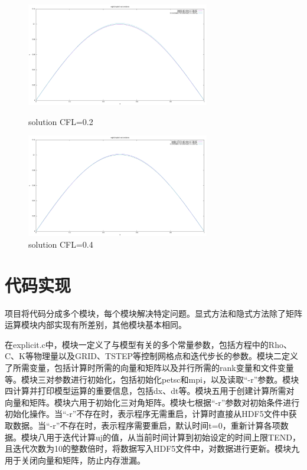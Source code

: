 \documentclass[final]{cvpr}
\begin{document}
\begin{figure}[t]
	\centering
	\begin{minipage}[t]{0.48\textwidth}
		\centering
		\includegraphics[width=8cm]{./figures/solution_CFL0.2.png}
		\caption{solution CFL=0.2}
	\end{minipage}
	\begin{minipage}[t]{0.48\textwidth}
		\centering
		\includegraphics[width=8cm]{./figures/solution_CFL0.4.png}
		\caption{solution CFL=0.4}
	\end{minipage}
\end{figure}
\section{代码实现}
\label{sec:RelatedWorks}
项目将代码分成多个模块，每个模块解决特定问题。显式方法和隐式方法除了矩阵运算模块内部实现有所差别，其他模块基本相同。

在explicit.c中，模块一定义了与模型有关的多个常量参数，包括方程中的Rho、C、K等物理量以及GRID、TSTEP等控制网格点和迭代步长的参数。模块二定义了所需变量，包括计算时所需的向量和矩阵以及并行所需的rank变量和文件变量等。模块三对参数进行初始化，包括初始化petsc和mpi，以及读取“-r”参数。模块四计算并打印模型运算的重要信息，包括dx、dt等。模块五用于创建计算所需对向量和矩阵。模块六用于初始化三对角矩阵。模块七根据“-r”参数对初始条件进行初始化操作。当“-r”不存在时，表示程序无需重启，计算时直接从HDF5文件中获取数据。当“-r”不存在时，表示程序需要重启，默认时间t=0，重新计算各项数据。模块八用于迭代计算uj的值，从当前时间计算到初始设定的时间上限TEND，且迭代次数为10的整数倍时，将数据写入HDF5文件中，对数据进行更新。模块九用于关闭向量和矩阵，防止内存泄漏。
\end{document}
